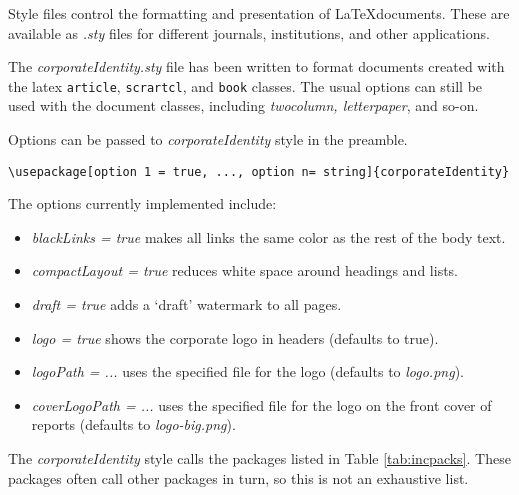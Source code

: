 Style files control the formatting and presentation of \LaTeX documents. These are available as \emph{.sty} files for different journals, institutions, and other applications.

The \emph{corporateIdentity.sty} file has been written to format documents created with the latex \texttt{article}, \texttt{scrartcl}, and \texttt{book} classes. The usual options can still be used with the document classes, including \emph{twocolumn, letterpaper}, and so-on.

Options can be passed to \emph{corporateIdentity} style in the preamble.

\begin{lstlisting}
\usepackage[option 1 = true, ..., option n= string]{corporateIdentity}
\end{lstlisting}

The options currently implemented include:
\begin{itemize}
  \item \emph{blackLinks = true} makes all links the same color as the rest of the body text.
  \item \emph{compactLayout = true} reduces white space around headings and lists.
  \item \emph{draft = true} adds a `draft' watermark to all pages.
  \item \emph{logo = true} shows the corporate logo in headers (defaults to true).
  \item \emph{logoPath = ...} uses the specified file for the logo (defaults to \emph{logo.png}).
  \item \emph{coverLogoPath = ...} uses the specified file for the logo on the front cover of reports (defaults to \emph{logo-big.png}).
\end{itemize}

The \emph{corporateIdentity} style calls the packages listed in Table \ref{tab:incpacks}. These packages often call other packages in turn, so this is not an exhaustive list.

